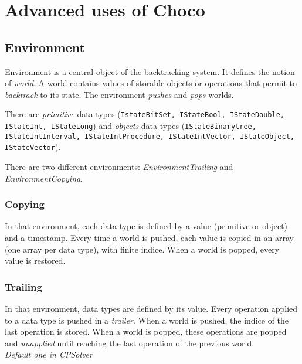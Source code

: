 \label{advanced}
\hypertarget{advanced}{}


\chapter{Advanced uses of Choco}\label{advanced:advancedusesofchoco}\hypertarget{advanced:advancedusesofchoco}{}

\section{Environment}\label{advanced:environment}\hypertarget{advanced:environment}{}

Environment is a central object of the backtracking system. It defines the notion of \textit{world}. A world contains values of storable objects or operations that permit to \textit{backtrack} to its state. The environment \textit{pushes} and \textit{pops} worlds.

There are \textit{primitive} data types (\texttt{IstateBitSet, IStateBool, IStateDouble, IStateInt, IStateLong}) and \textit{objects} data types (\texttt{IStateBinarytree, IStateIntInterval, IStateIntProcedure, IStateIntVector, IStateObject, IStateVector}).

There are two different environments: \textit{EnvironmentTrailing} and \textit{EnvironmentCopying}.

\subsection{Copying}\label{advanced:copying}\hypertarget{advanced:copying}{}
In that environment, each data type is defined by a value (primitive or object) and a timestamp. Every time a world is pushed, each value is copied in an array (one array per data type), with finite indice. When a world is popped, every value is restored. 

\subsection{Trailing}\label{advanced:trailing}\hypertarget{advanced:trailing}{}
In that environment, data types are defined by its value. Every operation applied to a data type is pushed in a \textit{trailer}. When a world is pushed, the indice of the last operation is stored. When a world is popped, these operations are popped and \textit{unapplied} until reaching the last operation of the previous world.\\\textit{Default one in CPSolver}

